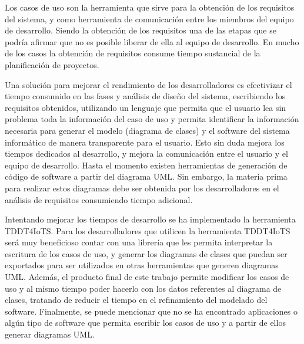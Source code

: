 
Los casos de uso son la herramienta que sirve para la obtención de los requisitos del sistema, y como herramienta de comunicación entre los miembros del equipo de desarrollo. Siendo la obtención de los requisitos una de las etapas que se podría afirmar que no es posible liberar de ella al equipo de desarrollo. En mucho de los casos la obtención de requisitos consume tiempo sustancial de la planificación de proyectos.

Una solución para mejorar el rendimiento de los desarrolladores es efectivizar el tiempo consumido en las fases y análisis de diseño del sistema, escribiendo los requisitos obtenidos, utilizando un lenguaje que permita que el usuario lea sin problema toda la información del caso de uso y permita identificar la información necesaria para generar el modelo (diagrama de clases) y el software del sistema informático de manera transparente para el usuario. Esto sin duda mejora los tiempos dedicados al desarrollo, y mejora la comunicación entre el usuario y el equipo de desarrollo. Hasta el momento existen herramientas de generación de código de software a partir del diagrama UML. Sin embargo, la materia prima para realizar estos diagramas debe ser obtenida por los desarrolladores en el análisis de requisitos consumiendo tiempo adicional.   

 Intentando mejorar los tiempos de desarrollo se ha implementado la herramienta TDDT4IoTS. Para  los desarrolladores que utilicen la herramienta TDDT4IoTS será muy beneficioso contar con una librería que les permita interpretar la escritura de los casos de uso, y generar los diagramas de clases que puedan ser exportados para ser utilizados en otras herramientas que generen diagramas UML. Además, el producto final de este trabajo permite modificar los casos de uso y al mismo tiempo poder hacerlo con los datos referentes al diagrama de clases, tratando de reducir el tiempo en el refinamiento del modelado del software. Finalmente, se puede mencionar que no se ha encontrado aplicaciones o algún tipo de software que permita escribir los casos de uso y a partir de ellos generar diagramas UML.